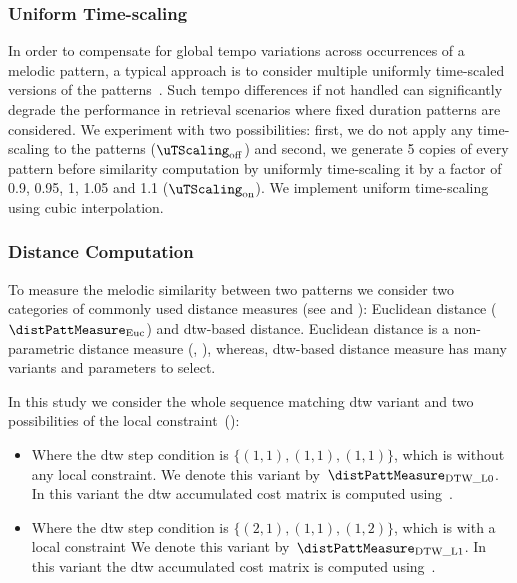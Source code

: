 \subsubsection{Uniform Time-scaling}
\label{sec:patterns_melodic_similarity_time_scaling}

In order to compensate for global tempo variations across occurrences of a melodic pattern, a typical approach is to consider multiple uniformly time-scaled versions of the patterns~\citep{mazzoni2001melody,zhu2003query,kotsifakos2012survey}. Such tempo differences if not handled can significantly degrade the performance in retrieval scenarios where fixed duration patterns are considered. We experiment with two possibilities: first, we do not apply any time-scaling to the patterns ($\uTScaling_{\mathrm{off}}$) and second, we generate 5 copies of every pattern before similarity computation by uniformly time-scaling it by a factor of 0.9, 0.95, 1, 1.05 and 1.1 ($\uTScaling_{\mathrm{on}}$). We implement uniform time-scaling using cubic interpolation. 


\subsubsection{Distance Computation}
\label{sec:patterns_melodic_similarity_dissimilarity measures}

To measure the melodic similarity between two patterns we consider two categories of commonly used distance measures (see  and ): Euclidean distance ($\distPattMeasure_{\mathrm{Euc}}$) and \acrfull{dtw}-based distance. Euclidean distance is a non-parametric distance measure (, ), whereas, \gls{dtw}-based distance measure has many variants and parameters to select. 

In this study we consider the whole sequence matching \gls{dtw} variant and two possibilities of the local constraint~():

\begin{itemize}
	\item Where the \gls{dtw} step condition is $\lbrace(1,1), (1,1), (1,1)\rbrace$, which is without any local constraint. We denote this variant by~$\distPattMeasure_{\mathrm{DTW\_L0}}$. In this variant the \gls{dtw} accumulated cost matrix is computed using~.
	\item Where the \gls{dtw} step condition is $\lbrace(2,1), (1,1), (1,2)\rbrace$, which is with a local constraint We denote this variant by~$\distPattMeasure_{\mathrm{DTW\_L1}}$. In this variant the \gls{dtw} accumulated cost matrix is computed using~.
\end{itemize}

